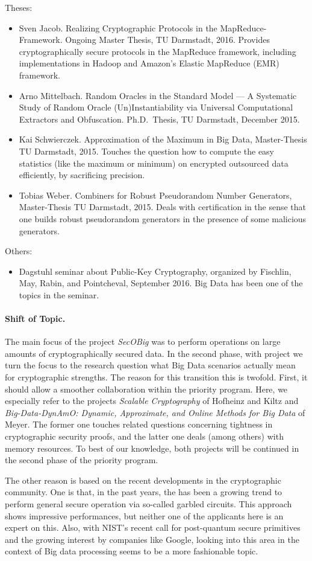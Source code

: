 \noindent
Theses:
\begin{itemize}
\item Sven Jacob. Realizing Cryptographic Protocols in the MapReduce-Framework. Ongoing Master Thesis, TU Darmstadt, 2016. Provides cryptographically secure protocols in the MapReduce framework, including implementations in Hadoop and Amazon's Elastic MapReduce (EMR) framework.
%
\item Arno Mittelbach. Random Oracles in the Standard Model --- A Systematic Study of Random Oracle (Un)Instantiability via Universal Computational Extractors and Obfuscation. Ph.D.~Thesis, TU Darmstadt, December 2015.
%
\item Kai Schwierczek. Approximation of the Maximum in Big Data, Master-Thesis TU Darmstadt, 2015. Touches the question how to compute the easy statistics (like the maximum or minimum) on encrypted outsourced data efficiently, by sacrificing precision.
%
\item Tobias Weber. Combiners for Robust Pseudorandom Number Generators, Master-Thesis TU Darmstadt, 2015. Deals with certification in the sense that one builds robust pseudorandom generators in the presence of some malicious generators.
%
\end{itemize}

\noindent
Others:
\begin{itemize}
\item Dagstuhl seminar about Public-Key Cryptography, organized by Fischlin, May, Rabin, and Pointcheval, September 2016. Big Data has been one of the topics in the seminar.
\end{itemize}


\paragraph{Shift of Topic.}
The main focus of the project \emph{SecOBig} was to perform operations on large amounts of cryptographically secured data. In the second phase, with project \emph{\memoc} we turn the focus to the research question what Big Data scenarios actually mean for cryptographic strengths. The reason for this transition this is twofold. First, it should allow a smoother collaboration within the priority program. Here, we especially refer to the projects \emph{Scalable Cryptography} of Hofheinz and Kiltz and \emph{Big-Data-DynAmO: Dynamic, Approximate, and Online Methods for Big Data} of Meyer. The former one touches related questions concerning tightness in cryptographic security proofs, and the latter one deals (among others) with memory resources. To best of our knowledge, both projects will be continued in the second phase of the priority program.

The other reason is based on the recent developments in the cryptographic community. One is that, in the past years, the has been a growing trend to perform general secure operation via so-called garbled circuits. This approach shows impressive performances, but neither one of the applicants here is an expert on this. Also, with NIST's recent call for post-quantum secure primitives and the growing interest by companies like Google, looking into this area in the context of Big data processing seems to be a more fashionable topic.



